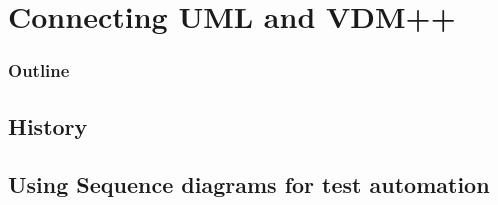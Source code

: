 %
%
\section{Connecting UML and VDM++}
%
%
\begin{frame}
  \frametitle{Outline}
  \tableofcontents[current]
\end{frame}


\subsection{History}
%
%
%
%	  	
%
%
%
%
%
%	  	
%
%
%
%


\subsection{Using Sequence diagrams for test automation}

